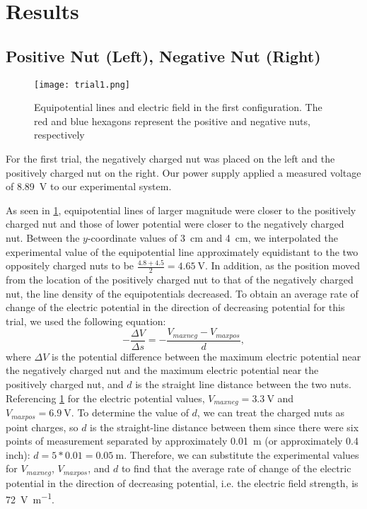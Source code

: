 \documentclass[10pt,journal,twoside]{IEEEtran}
\begin{document}
\section{Results}

\subsection{Positive Nut (Left), Negative Nut (Right)}
\begin{figure}
\begin{center}
\texttt{[image: trial1.png]} %
\end{center}
\caption{Equipotential lines and electric field in the first configuration. The red and blue hexagons represent the positive and negative nuts, respectively}
\label{fig:2}
\end{figure}
For the first trial, the negatively charged nut was placed on the left and the positively charged nut on the right. Our power supply applied a measured voltage of \qty{8.89}{\volt} to our experimental system.

As seen in \cref{fig:2}, equipotential lines of larger magnitude were closer to the positively charged nut and those of lower potential were closer to the negatively charged nut. Between the $y$-coordinate values of \qty{3}{\centi\meter} and \qty{4}{\centi\meter}, we interpolated the experimental value of the equipotential line approximately equidistant to the two oppositely charged nuts to be $\frac{4.8+4.5}{2}=\qty{4.65}{\volt}$. In addition, as the position moved from the location of the positively charged nut to that of the negatively charged nut, the line density of the equipotentials decreased. To obtain an average rate of change of the electric potential in the direction of decreasing potential for this trial, we used the following equation:
\begin{equation}
-\frac{\Delta V}{\Delta s} = -\frac{V_{max neg} - V_{max pos}}{d},
\label{eq:2}
\end{equation}
\noindent where $\Delta V$ is the potential difference between the maximum electric potential near the negatively charged nut and the maximum electric potential near the positively charged nut, and $d$ is the straight line distance between the two nuts. Referencing \cref{fig:2} for the electric potential values, $V_{max neg} = \qty{3.3}{\volt}$ and $V_{max pos} = \qty{6.9}{\volt}$. To determine the value of $d$, we can treat the charged nuts as point charges, so $d$ is the straight-line distance between them since there were six points of measurement separated by approximately \qty{0.01}{\meter} (or approximately 0.4 inch): $d= 5 * 0.01 = \qty{0.05}{\meter}$. Therefore, we can substitute the experimental values for $V_{max neg}$, $V_{max pos}$, and $d$ to find that the average rate of change of the electric potential in the direction of decreasing potential, i.e. the electric field strength, is \qty{72}{\volt\per\meter}.
\end{document}

